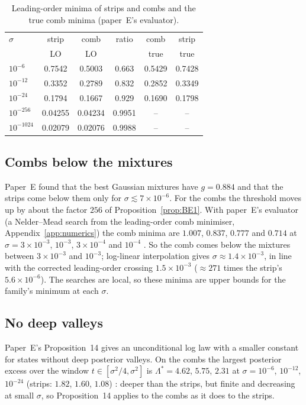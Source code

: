 \begin{table}
\caption{Leading-order minima of strips and combs \derivst{} and the true comb minima \numst{} (paper~E's evaluator).}
\label{tab:finite}
\begin{ruledtabular}
\begin{tabular}{lccccc}
$\sigma$ & strip & comb & ratio & comb & strip\\
 & LO & LO & & true & true\\ \hline
$10^{-6}$ & 0.7542 & 0.5003 & 0.663 & 0.5429 & 0.7428\\
$10^{-12}$ & 0.3352 & 0.2789 & 0.832 & 0.2852 & 0.3349\\
$10^{-24}$ & 0.1794 & 0.1667 & 0.929 & 0.1690 & 0.1798\\
$10^{-256}$ & 0.04255 & 0.04234 & 0.9951 & -- & --\\
$10^{-1024}$ & 0.02079 & 0.02076 & 0.9988 & -- & --\\
\end{tabular}
\end{ruledtabular}
\end{table}

\subsection{Combs below the mixtures}
Paper~E found that the best Gaussian mixtures have $g=0.884$ and that the strips come below them only for $\sigma\lesssim7\times10^{-6}$.
For the combs the threshold moves up by about the factor $256$ of Proposition~\ref{prop:BE1}. With paper~E's evaluator (a Nelder--Mead search
from the leading-order comb minimiser, Appendix~\ref{app:numerics}) the comb minima are $1.007$, $0.837$, $0.777$ and $0.714$ at
$\sigma=3\times10^{-3}$, $10^{-3}$, $3\times10^{-4}$ and $10^{-4}$ \numst. So the comb comes below the mixtures between $3\times10^{-3}$ and
$10^{-3}$; log-linear interpolation gives $\sigma\approx1.4\times10^{-3}$, in line with the corrected leading-order crossing $1.5\times10^{-3}$
($\approx271$ times the strip's $5.6\times10^{-6}$). The searches are local, so these minima are upper bounds for the family's minimum at each $\sigma$.

\subsection{No deep valleys}
Paper~E's Proposition~14 gives an unconditional log law with a smaller constant for states without deep posterior valleys. On the combs the
largest posterior excess over the window $t\in[\sigma^2/4,\sigma^2]$ is $\Lambda^*=4.62$, $5.75$, $2.31$ at $\sigma=10^{-6}$, $10^{-12}$, $10^{-24}$
(strips: $1.82$, $1.60$, $1.08$) \numst: deeper than the strips, but finite and decreasing at small $\sigma$, so Proposition~14 applies to
the combs as it does to the strips.

